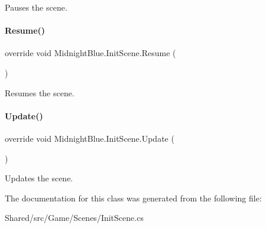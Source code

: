 Pauses the scene. 

\hypertarget{class_midnight_blue_1_1_init_scene_a01ade76252a492d20181bd2e00eb217f}{}\label{class_midnight_blue_1_1_init_scene_a01ade76252a492d20181bd2e00eb217f} 
\paragraph{\texorpdfstring{Resume()}{Resume()}}
{\footnotesize\ttfamily override void Midnight\+Blue.\+Init\+Scene.\+Resume (\begin{DoxyParamCaption}{ }\end{DoxyParamCaption})\hspace{0.3cm}{\ttfamily [inline]}}



Resumes the scene. 

\hypertarget{class_midnight_blue_1_1_init_scene_ad87861fb4f2a30f5168f6133aa10d3f4}{}\label{class_midnight_blue_1_1_init_scene_ad87861fb4f2a30f5168f6133aa10d3f4} 
\paragraph{\texorpdfstring{Update()}{Update()}}
{\footnotesize\ttfamily override void Midnight\+Blue.\+Init\+Scene.\+Update (\begin{DoxyParamCaption}{ }\end{DoxyParamCaption})\hspace{0.3cm}{\ttfamily [inline]}}



Updates the scene. 



The documentation for this class was generated from the following file\+:\begin{DoxyCompactItemize}
\item 
Shared/src/\+Game/\+Scenes/Init\+Scene.\+cs\end{DoxyCompactItemize}

